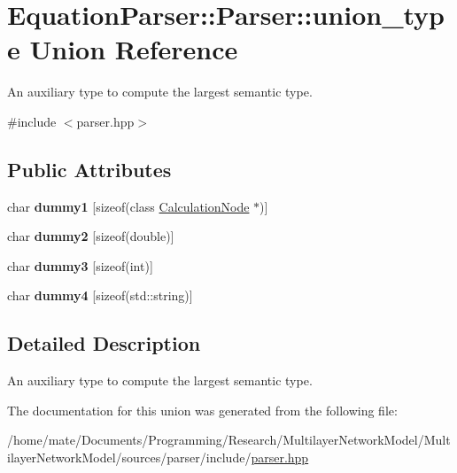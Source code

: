 \hypertarget{unionEquationParser_1_1Parser_1_1union__type}{}\section{Equation\+Parser\+:\+:Parser\+:\+:union\+\_\+type Union Reference}
\label{unionEquationParser_1_1Parser_1_1union__type}


An auxiliary type to compute the largest semantic type.  




{\ttfamily \#include $<$parser.\+hpp$>$}

\subsection*{Public Attributes}
\begin{DoxyCompactItemize}
\item 
char {\bfseries dummy1} \mbox{[}sizeof(class \hyperlink{classCalculationNode}{Calculation\+Node} $\ast$)\mbox{]}\hypertarget{unionEquationParser_1_1Parser_1_1union__type_aad74e0328cfdb9d46e8ba0b6552cfe80}{}\label{unionEquationParser_1_1Parser_1_1union__type_aad74e0328cfdb9d46e8ba0b6552cfe80}

\item 
char {\bfseries dummy2} \mbox{[}sizeof(double)\mbox{]}\hypertarget{unionEquationParser_1_1Parser_1_1union__type_ad29f0f3c2610dd9ac9e70e460742987b}{}\label{unionEquationParser_1_1Parser_1_1union__type_ad29f0f3c2610dd9ac9e70e460742987b}

\item 
char {\bfseries dummy3} \mbox{[}sizeof(int)\mbox{]}\hypertarget{unionEquationParser_1_1Parser_1_1union__type_a32ffa918357d6108417a051e004fa286}{}\label{unionEquationParser_1_1Parser_1_1union__type_a32ffa918357d6108417a051e004fa286}

\item 
char {\bfseries dummy4} \mbox{[}sizeof(std\+::string)\mbox{]}\hypertarget{unionEquationParser_1_1Parser_1_1union__type_a8426f83196a08e2010f24aa6630efc92}{}\label{unionEquationParser_1_1Parser_1_1union__type_a8426f83196a08e2010f24aa6630efc92}

\end{DoxyCompactItemize}


\subsection{Detailed Description}
An auxiliary type to compute the largest semantic type. 

The documentation for this union was generated from the following file\+:\begin{DoxyCompactItemize}
\item 
/home/mate/\+Documents/\+Programming/\+Research/\+Multilayer\+Network\+Model/\+Multilayer\+Network\+Model/sources/parser/include/\hyperlink{parser_8hpp}{parser.\+hpp}\end{DoxyCompactItemize}
